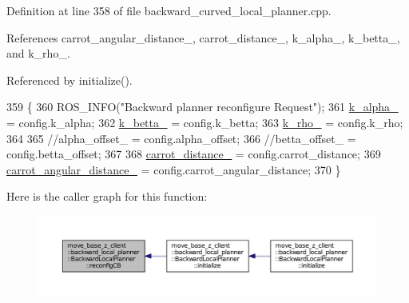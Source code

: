 Definition at line 358 of file backward\+\_\+curved\+\_\+local\+\_\+planner.\+cpp.



References carrot\+\_\+angular\+\_\+distance\+\_\+, carrot\+\_\+distance\+\_\+, k\+\_\+alpha\+\_\+, k\+\_\+betta\+\_\+, and k\+\_\+rho\+\_\+.



Referenced by initialize().


\begin{DoxyCode}
359 \{
360     ROS\_INFO(\textcolor{stringliteral}{"Backward planner reconfigure Request"});
361     \hyperlink{classmove__base__z__client_1_1backward__local__planner_1_1BackwardLocalPlanner_ac859500c0329247de08daf864fd2d4b1}{k\_alpha\_} = config.k\_alpha;
362     \hyperlink{classmove__base__z__client_1_1backward__local__planner_1_1BackwardLocalPlanner_aa2f7fe022cdc4eb11c17f6f576c732c6}{k\_betta\_} = config.k\_betta;
363     \hyperlink{classmove__base__z__client_1_1backward__local__planner_1_1BackwardLocalPlanner_a9ae9a8c4c4663a999ba107aea9f6868d}{k\_rho\_} = config.k\_rho;
364 
365     \textcolor{comment}{//alpha\_offset\_ = config.alpha\_offset;}
366     \textcolor{comment}{//betta\_offset\_ = config.betta\_offset;}
367 
368     \hyperlink{classmove__base__z__client_1_1backward__local__planner_1_1BackwardLocalPlanner_a6dc3aa0ff63f9f7d0aae852755734b5d}{carrot\_distance\_} = config.carrot\_distance;
369     \hyperlink{classmove__base__z__client_1_1backward__local__planner_1_1BackwardLocalPlanner_a3d6cba0748b85a67f5dfd7740de9530f}{carrot\_angular\_distance\_} = config.carrot\_angular\_distance;
370 \}
\end{DoxyCode}


Here is the caller graph for this function\+:
\nopagebreak
\begin{figure}[H]
\begin{center}
\leavevmode
\includegraphics[width=350pt]{classmove__base__z__client_1_1backward__local__planner_1_1BackwardLocalPlanner_a9dfe3fd3fd7a0c8ec414a78e1300d09c_icgraph}
\end{center}
\end{figure}


